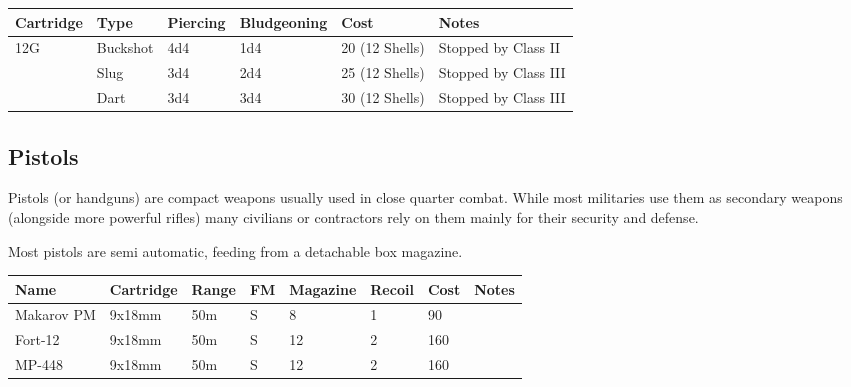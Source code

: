 \begin{center}
  \begin{tabular}{| l | l | l | l | l | l |}
    \hline
    \textbf{Cartridge}  & \textbf{Type}   & \textbf{Piercing} &
    \textbf{Bludgeoning} & \textbf{Cost}  & \textbf{Notes}        \\ \hline

    12G     & Buckshot & 4d4  & 1d4 & 20 (12 Shells) & Stopped by Class II \\ \hline
    \,      & Slug     & 3d4  & 2d4 & 25 (12 Shells) & Stopped by Class III \\ \hline
    \,      & Dart     & 3d4  & 3d4 & 30 (12 Shells) & Stopped by Class III \\ \hline

  \end{tabular}
\end{center}

\subsection{Pistols}

Pistols (or handguns) are compact weapons usually used in close quarter combat.
While most militaries use them as secondary weapons (alongside more powerful
rifles) many civilians or contractors rely on them mainly for their security
and defense.

Most pistols are semi automatic, feeding from a detachable box magazine.

\begin{center}
  \begin{tabular}{| l | l | l | l | l | l | l | l |}
    \hline
    \textbf{Name} & \textbf{Cartridge} & \textbf{Range} &
    \textbf{FM} & \textbf{Magazine} & \textbf{Recoil} &
    \textbf{Cost} & \textbf{Notes} \\ \hline

    Makarov PM & 9x18mm & 50m & S & 8  & 1 & 90  & \\ \hline
    Fort-12    & 9x18mm & 50m & S & 12 & 2 & 160 & \\ \hline
    MP-448     & 9x18mm & 50m & S & 12 & 2 & 160 & \\ \hline

  \end{tabular}
\end{center}

